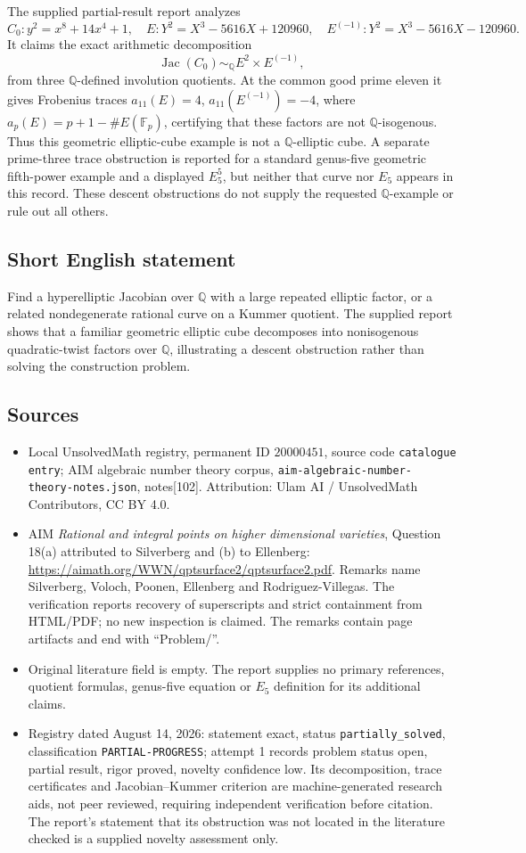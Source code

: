 \documentclass[11pt]{article}
\newcommand{\Q}{\mathbb{Q}}
\newcommand{\F}{\mathbb{F}}
\begin{document}
The supplied partial-result report analyzes
\[
 C_0:y^2=x^8+14x^4+1,\quad
 E:Y^2=X^3-5616X+120960,\quad
 E^{(-1)}:Y^2=X^3-5616X-120960.
\]
It claims the exact arithmetic decomposition
\[
 \operatorname{Jac}(C_0)\sim_{\Q}E^2\times E^{(-1)},
\]
from three \(\Q\)-defined involution quotients. At the common good prime eleven it gives Frobenius traces \(a_{11}(E)=4\), \(a_{11}(E^{(-1)})=-4\), where \(a_p(E)=p+1-\#E(\F_p)\), certifying that these factors are not \(\Q\)-isogenous. Thus this geometric elliptic-cube example is not a \(\Q\)-elliptic cube. A separate prime-three trace obstruction is reported for a standard genus-five geometric fifth-power example and a displayed \(E_5^5\), but neither that curve nor \(E_5\) appears in this record. These descent obstructions do not supply the requested \(\Q\)-example or rule out all others.
\subsection{Short English statement}
Find a hyperelliptic Jacobian over \(\Q\) with a large repeated elliptic factor, or a related nondegenerate rational curve on a Kummer quotient. The supplied report shows that a familiar geometric elliptic cube decomposes into nonisogenous quadratic-twist factors over \(\Q\), illustrating a descent obstruction rather than solving the construction problem.
\subsection{Sources}
\begin{itemize}
\item Local UnsolvedMath registry, permanent ID \(20000451\), source code \texttt{catalogue entry}; AIM algebraic number theory corpus, \texttt{aim-algebraic-number-theory-notes.json}, notes[102]. Attribution: Ulam AI / UnsolvedMath Contributors, CC BY 4.0.
\item AIM \emph{Rational and integral points on higher dimensional varieties}, Question 18(a) attributed to Silverberg and (b) to Ellenberg: \url{https://aimath.org/WWN/qptsurface2/qptsurface2.pdf}. Remarks name Silverberg, Voloch, Poonen, Ellenberg and Rodriguez-Villegas. The verification reports recovery of superscripts and strict containment from HTML/PDF; no new inspection is claimed. The remarks contain page artifacts and end with ``Problem/''.
\item Original literature field is empty. The report supplies no primary references, quotient formulas, genus-five equation or \(E_5\) definition for its additional claims.
\item Registry dated August 14, 2026: statement exact, status \texttt{partially\_solved}, classification \texttt{PARTIAL-PROGRESS}; attempt 1 records problem status open, partial result, rigor proved, novelty confidence low. Its decomposition, trace certificates and Jacobian--Kummer criterion are machine-generated research aids, not peer reviewed, requiring independent verification before citation. The report's statement that its obstruction was not located in the literature checked is a supplied novelty assessment only.
\end{itemize}
\end{document}
